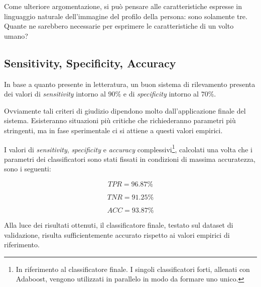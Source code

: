                 Come ulteriore argomentazione, si può pensare alle caratteristiche espresse in linguaggio naturale dell'immagine del profilo della persona: sono solamente tre. 
                Quante ne sarebbero necessarie per esprimere le caratteristiche di un volto umano?

            \subsection{Sensitivity, Specificity, Accuracy} %
            \label{sub:sensitivity_specificity_accuracy}
                In base a quanto presente in letteratura, un buon sistema di rilevamento presenta dei valori di \emph{sensitivity} intorno al $90\%$ e di \emph{specificity} intorno al $70\%$.

                Ovviamente tali criteri di giudizio dipendono molto dall'applicazione finale del sistema.
                Esisteranno situazioni più critiche che richiederanno parametri più stringenti, ma in fase sperimentale ci si attiene a questi valori empirici.

                I valori di \emph{sensitivity}, \emph{specificity} e \emph{accuracy} complessivi\footnote{In riferimento al classificatore finale. I singoli classificatori forti, allenati con Adaboost, vengono utilizzati in parallelo in modo da formare uno unico.}, calcolati una volta che i parametri dei classificatori sono stati fissati in condizioni di massima accuratezza, sono i seguenti:

                \begin{equation}
                    \label{eq:sensitivity_value}
                    TPR = 96.87\%
                \end{equation}

                \begin{equation}
                    \label{eq:specificity_value}
                    TNR = 91.25\%
                \end{equation}

                \begin{equation}
                    \label{eq:accuracy_value}
                    ACC = 93.87\%
                \end{equation}

                Alla luce dei risultati ottenuti, il classificatore finale, testato sul dataset di validazione, risulta sufficientemente accurato rispetto ai valori empirici di riferimento.

